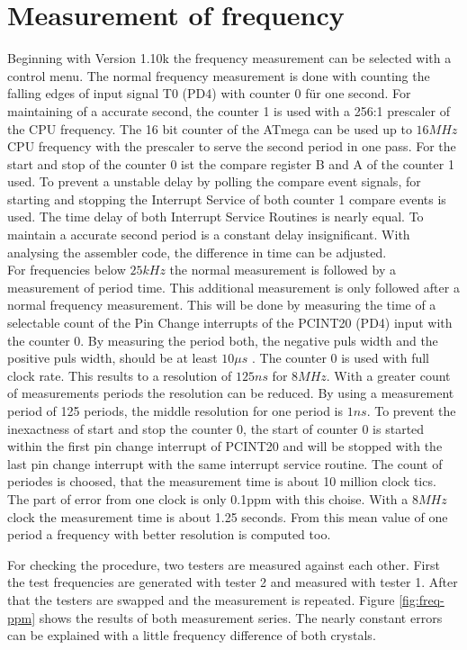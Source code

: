 
\section{Measurement of frequency}
\label{sec:frequency}

Beginning with Version 1.10k the frequency measurement can be selected with a control menu.
The normal frequency measurement is done with counting the falling edges of input signal T0 (PD4)
with counter 0 für one second. For maintaining of a accurate second, the counter 1 is used
with a 256:1 prescaler of the CPU frequency. 
The 16 bit counter of the ATmega can be used up to \(16MHz\) CPU frequency with the prescaler to
serve the second period in one pass.
For the start and stop of the counter 0 ist the compare register B and A of the counter 1 used.
To prevent a unstable delay by polling the compare event signals, for starting and stopping the
Interrupt Service of both counter 1 compare events is used.
The time delay of both Interrupt Service Routines is nearly equal.
To maintain a accurate second period is a constant delay insignificant.
With analysing the assembler code, the difference in time can be adjusted.\\

For frequencies below \(25kHz\) the normal measurement is followed by a measurement of
period time. This additional measurement is only followed after a normal frequency measurement.
This will be done by measuring the time of a selectable count of the Pin Change interrupts
of the PCINT20 (PD4) input with the counter 0.
By measuring the period both, the negative puls width and the positive puls width, should be
at least \(10\mu s\) .
The counter 0 is used with full clock rate. This results to a resolution of \(125ns\) for
\(8MHz\). With a greater count of measurements periods the resolution can be reduced.
By using a measurement period of 125 periods, the middle resolution for one period is \(1ns\).
To prevent the inexactness of start and stop the counter 0, the start of counter 0 is started
within the first pin change interrupt of PCINT20 and will be stopped with the last pin change interrupt
with the same interrupt service routine.
The count of periodes is choosed, that the measurement time is about 10 million clock tics.
The part of error from one clock is only 0.1ppm with this choise.
With a \(8MHz\) clock the measurement time is about 1.25 seconds.
From this mean value of one period a frequency with better resolution is computed too.

For checking the procedure, two testers are measured against each other.
First the test frequencies are generated with tester 2 and measured with tester 1.
After that the testers are swapped and the measurement is repeated.
Figure \ref{fig:freq-ppm} shows the results of both measurement series.
The nearly constant errors can be explained with a little frequency difference of both crystals.

